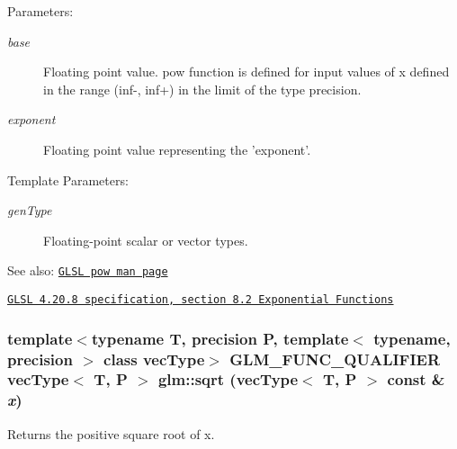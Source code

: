 \begin{Desc}
\item[Parameters:]
\begin{description}
\item[{\em base}]Floating point value. pow function is defined for input values of x defined in the range (inf-, inf+) in the limit of the type precision. \item[{\em exponent}]Floating point value representing the 'exponent'. \end{description}
\end{Desc}
\begin{Desc}
\item[Template Parameters:]
\begin{description}
\item[{\em genType}]Floating-point scalar or vector types.\end{description}
\end{Desc}
\begin{Desc}
\item[See also:]\href{http://www.opengl.org/sdk/docs/manglsl/xhtml/pow.xml}{\tt GLSL pow man page} 

\href{http://www.opengl.org/registry/doc/GLSLangSpec.4.20.8.pdf}{\tt GLSL 4.20.8 specification, section 8.2 Exponential Functions} \end{Desc}
\hypertarget{group__core__func__exponential_gfe49b7b63045b6ab94bffbcd7e7a7bc8}{
\subsubsection[sqrt]{\setlength{\rightskip}{0pt plus 5cm}template$<$typename T, precision P, template$<$ typename, precision $>$ class vecType$>$ GLM\_\-FUNC\_\-QUALIFIER vecType$<$ T, P $>$ glm::sqrt (vecType$<$ T, P $>$ const \& {\em x})}}
\label{group__core__func__exponential_gfe49b7b63045b6ab94bffbcd7e7a7bc8}


Returns the positive square root of x.

